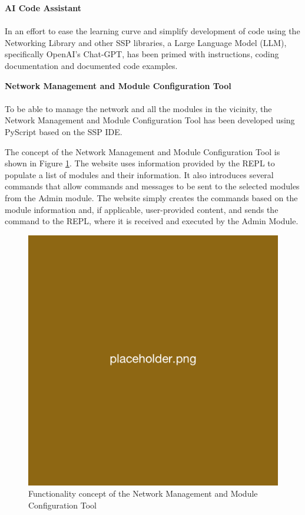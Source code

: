 \textbf{\label{sec:methods_configai}AI Code Assistant}\\\\
In an effort to ease the learning curve and simplify development of code using the Networking Library and other SSP libraries, a Large Language Model (LLM), specifically  OpenAI's Chat-GPT, has been primed with instructions, coding documentation and documented code examples.

\textbf{\label{sec:methods_nmt}Network Management and Module Configuration Tool}\\\\
To be able to manage the network and all the modules in the vicinity, the Network Management and Module Configuration Tool has been developed using PyScript based on the SSP IDE.

The concept of the Network Management and Module Configuration Tool is shown in Figure \ref{fig:nmmct_concept}. The website uses information provided by the REPL to populate a list of modules and their information. It also introduces several commands that allow commands and messages to be sent to the selected modules from the Admin module. The website simply creates the commands based on the module information and, if applicable, user-provided content, and sends the command to the REPL, where it is received and executed by the Admin Module.

\begin{figure}[H]
    \centering
    \includegraphics[width=0.5\linewidth]{overleaf/images/placeholder.png}
    \vspace{\ftspace}
    \caption{Functionality concept of the Network Management and Module Configuration Tool}
    \vspace{\ftspace}
    \label{fig:nmmct_concept}
\end{figure}

